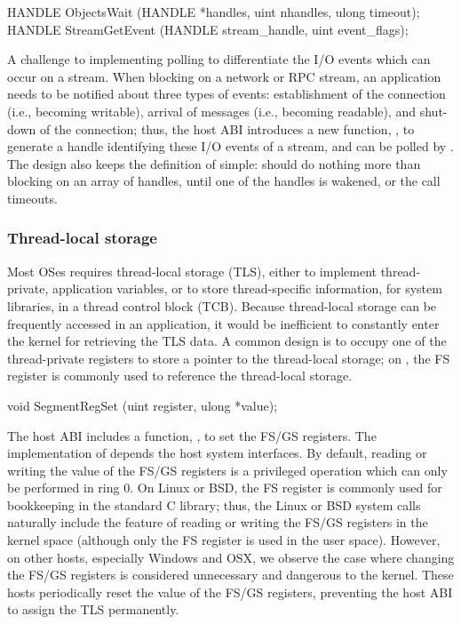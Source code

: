 \begin{paldef}
HANDLE ObjectsWait    (HANDLE *handles, uint nhandles,
                       ulong timeout);
HANDLE StreamGetEvent (HANDLE stream_handle,
                       uint event_flags);
\end{paldef}


A challenge to implementing polling
to differentiate the I/O events which can occur on a stream.
When blocking on a network or RPC stream, an application needs to be notified
about three types of events:
establishment of the connection (i.e., becoming writable), arrival of messages (i.e., becoming readable), and shut-down of the connection;
thus, the \graphene{} host ABI introduces a new function,
,
to generate a handle identifying these I/O events of a stream,
and can be polled by .
The design also keeps the definition of  simple:
 should do nothing more than blocking on an array of handles,
until one of the handles
is wakened, or the call timeouts.


\subsubsection*{Thread-local storage}


Most OSes requires thread-local storage (TLS),
either to implement thread-private, application variables, or to store thread-specific information, for system libraries, in a thread control block (TCB).
Because thread-local storage can be frequently accessed
in an application,
it would be inefficient to constantly
enter the kernel for retrieving the TLS data.
A common design is to occupy one of the thread-private registers
to store a pointer to the thread-local storage;
on \graphenearch{}, the FS register is commonly used to reference the thread-local storage.




\begin{paldef}
void SegmentRegSet (uint register, ulong *value);
\end{paldef}



The host ABI includes a function, , to set the FS/GS registers.
The implementation of 
depends the host system interfaces. 
By default, reading or writing the value of the FS/GS registers is a privileged operation
which can only be performed in ring 0.
On Linux or BSD, the FS register is commonly used for bookkeeping in the standard C library;
thus, the Linux or BSD system calls naturally include the feature of reading or writing the FS/GS registers in the kernel space (although only the FS register is used in the user space).
However, on other hosts, especially Windows and OSX,
we observe the case where changing the FS/GS registers is considered unnecessary and dangerous to the kernel.
These hosts periodically reset the value of the FS/GS registers,
preventing the host ABI to assign the TLS permanently.


